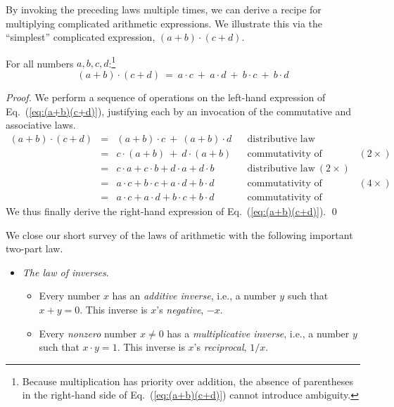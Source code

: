 By invoking the preceding laws multiple times, we can derive a recipe for multiplying complicated arithmetic expressions.  We illustrate this via the ``simplest'' complicated expression, $(a+b) \cdot (c+d)$.

\begin{prop}
\label{prop:(a+b)(c+d)}
For all numbers $a, b, c, d$:\footnote{Because multiplication has priority over addition, the absence of parentheses in the right-hand side of Eq.~(\ref{eq:(a+b)(c+d)}) cannot introduce ambiguity.}
\begin{equation}
\label{eq:(a+b)(c+d)}
(a+b) \cdot (c+d) \ = \ a \cdot c \ + \ a \cdot d \ + \ b \cdot c \ + \ b \cdot d
\end{equation}
\end{prop}

\begin{proof}
We perform a sequence of operations on the left-hand expression of Eq.~(\ref{eq:(a+b)(c+d)}), justifying each by an invocation of the commutative and associative laws.
\[
\begin{array}{lclll}
(a+b) \cdot (c+d) & = & (a+b) \cdot c \ + \ (a+b) \cdot d
& & \mbox{distributive law} \\ 
  & = & c \cdot (a+b) \ + \ d \cdot (a+b)
& & \mbox{commutativity of multiplication} \ (2 \times) \\
  & = & c \cdot a + c \cdot b + d \cdot a + d \cdot b 
& & \mbox{distributive law} \ (2 \times) \\
  & = & a \cdot c + b \cdot c + a \cdot d + b \cdot d
& & \mbox{commutativity of multiplication} \ (4 \times) \\
  & = &  a \cdot c + a \cdot d + b \cdot c + b \cdot d
& & \mbox{commutativity of addition}
\end{array}
\]
We thus finally derive the right-hand expression of Eq.~(\ref{eq:(a+b)(c+d)}).  \qed
\end{proof}

\medskip

 
 
 

We close our short survey of the laws of arithmetic with the following important two-part law.
\begin{itemize}
\item
{\it The law of inverses}.
 \begin{itemize}
 \item
Every number $x$ has an {\em additive inverse}, i.e., a number $y$ such that $x+y =0$.  This inverse is $x$'s {\it negative}, $-x$.
  \medskip\item
Every {\em nonzero} number $x \neq 0$ has a {\em multiplicative inverse}, i.e., a number $y$ such that $x \cdot y = 1$.  This inverse is $x$'s {\it reciprocal}, $1/x$.
  \end{itemize}
\end{itemize}


